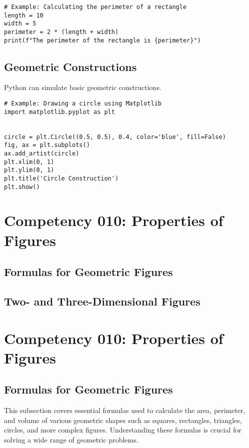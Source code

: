 \documentclass{book}
\begin{document}
\begin{lstlisting}[style=pythonstyle]
# Example: Calculating the perimeter of a rectangle
length = 10
width = 5
perimeter = 2 * (length + width)
print(f"The perimeter of the rectangle is {perimeter}")
\end{lstlisting}


\subsection{Geometric Constructions}
Python can simulate basic geometric constructions.


\begin{lstlisting}[style=pythonstyle]
# Example: Drawing a circle using Matplotlib
import matplotlib.pyplot as plt


circle = plt.Circle((0.5, 0.5), 0.4, color='blue', fill=False)
fig, ax = plt.subplots()
ax.add_artist(circle)
plt.xlim(0, 1)
plt.ylim(0, 1)
plt.title('Circle Construction')
plt.show()
\end{lstlisting}

\section{Competency 010: Properties of Figures}
\subsection{Formulas for Geometric Figures}
\subsection{Two- and Three-Dimensional Figures}


\section{Competency 010: Properties of Figures}


\subsection{Formulas for Geometric Figures}
This subsection covers essential formulas used to calculate the area, perimeter, and volume of various geometric shapes such as squares, rectangles, triangles, circles, and more complex figures. Understanding these formulas is crucial for solving a wide range of geometric problems.
\end{document}
